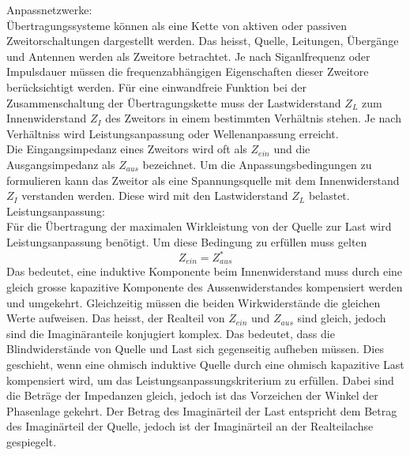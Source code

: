 Anpassnetzwerke: \\
Übertragungssysteme können als eine Kette von aktiven oder passiven  Zweitorschaltungen dargestellt werden. Das heisst, Quelle, Leitungen, Übergänge und Antennen werden als Zweitore betrachtet. Je nach Siganlfrequenz oder Impulsdauer müssen die frequenzabhängigen Eigenschaften dieser Zweitore berücksichtigt werden. Für eine einwandfreie Funktion bei der Zusammenschaltung der Übertragungskette muss der Lastwiderstand $Z_L$ zum Innenwiderstand $Z_I$ des Zweitors in einem bestimmten Verhältnis stehen. Je nach Verhältniss wird Leistungsanpassung oder Wellenanpassung erreicht. \\
Die Eingangsimpedanz eines Zweitors wird oft als $Z_{ein}$ und die Ausgangsimpedanz als $Z_{aus}$ bezeichnet. 
Um die Anpassungsbedingungen zu formulieren kann das Zweitor als eine Spannungsquelle mit dem Innenwiderstand $Z_I$ verstanden werden. Diese wird  mit den Lastwiderstand $Z_L$ belastet.\\

Leistungsanpassung: \\
Für die Übertragung der maximalen Wirkleistung von der Quelle zur Last  wird Leistungsanpassung benötigt. Um diese Bedingung zu erfüllen muss gelten \cite{Tekom}
\[Z_{ein} = Z_{aus}^*\]
Das bedeutet, eine induktive Komponente beim Innenwiderstand muss  durch eine gleich grosse kapazitive Komponente des Aussenwiderstandes kompensiert werden und umgekehrt. Gleichzeitig müssen die beiden Wirkwiderstände die gleichen Werte aufweisen. Das heisst, der Realteil von $Z_{ein}$ und $Z_{aus}$ sind gleich, jedoch sind die Imaginäranteile konjugiert komplex. Das bedeutet, dass die Blindwiderstände von Quelle und Last sich gegenseitig aufheben müssen. Dies geschieht, wenn eine ohmisch induktive Quelle durch eine ohmisch kapazitive Last kompensiert wird, um das Leistungsanpassungskriterium zu erfüllen. Dabei sind die Beträge der Impedanzen gleich, jedoch ist das Vorzeichen der Winkel der Phasenlage  gekehrt. Der Betrag des Imaginärteil der Last entspricht dem Betrag des Imaginärteil der Quelle, jedoch ist der Imaginärteil an der Realteilachse gespiegelt.\\

